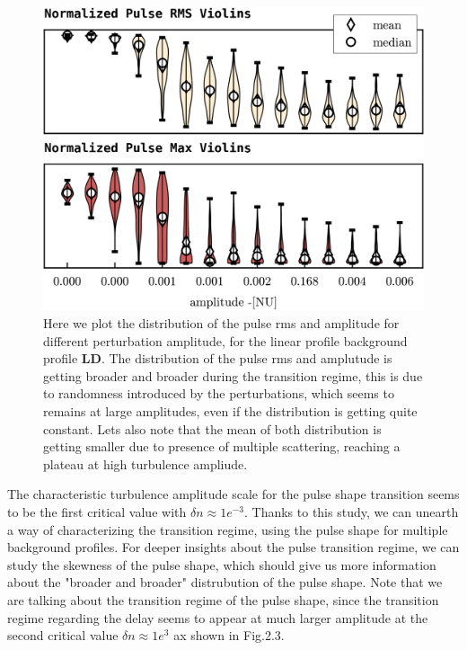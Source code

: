 \documentclass[11pt,a4paper,openany]{report}
\begin{document}
\begin{multicols}{2}
    \begin{figure}[H]
        \centering
        \includegraphics[width=1\linewidth]{./figures/pulse_overview.png}
        \caption{Here we plot the distribution of the pulse rms and amplitude for different perturbation amplitude, for the linear profile background profile \textbf{LD}. The distribution of the pulse rms  and amplutude is getting broader and broader during the transition regime, this is due to randomness introduced by the perturbations, which seems to remains at large amplitudes, even if the distribution is getting quite constant.
            Lets also note that the mean of both distribution is getting smaller due to presence of multiple scattering, reaching a plateau at high turbulence ampliude.}
        \label{fig:barrier}
    \end{figure}
    The characteristic turbulence amplitude scale for the pulse shape transition seems to be the first critical value with $\delta n \approx 1e^{-3}$. Thanks to this study, we can unearth a way of characterizing the transition regime, using the pulse shape for multiple background profiles. For deeper insights about the pulse transition regime, we can study the skewness of the pulse shape, which should give us more information about the "broader and broader" distrubution of the pulse shape.
    Note that we are talking about the transition regime of the pulse shape, since the transition regime regarding the delay seems to appear at much larger amplitude at the second critical value $\delta n \approx 1e^3$ ax shown in Fig.2.3.


\end{multicols}
\end{document}

